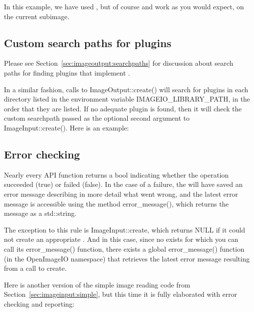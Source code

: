 In this example, we have used \readimage, but of course \readscanline
and \readtile work as you would expect, on the current subimage.


\subsection{Custom search paths for plugins}
\label{sec:imageinput:searchpaths}

Please see Section~\ref{sec:imageoutput:searchpaths} for discussion
about search paths for finding plugins that implement \ImageOutput.

In a similar fashion, calls to {\cf ImageOutput::create()}
will search for plugins in each directory listed in the environment
variable {\cf IMAGEIO_LIBRARY_PATH}, in the order that they are listed.
If no adequate plugin is found, then it will check the custom searchpath
passed as the optional second argument to {\cf ImageInput::create()}.
Here is an example:



\subsection{Error checking}
\label{sec:imageinput:errors}

Nearly every \ImageInput API function returns a {\cf bool} indicating
whether the operation succeeded ({\cf true}) or failed ({\cf false}).
In the case of a failure, the \ImageInput will have saved an error
message describing in more detail what went wrong, and the latest
error message is accessible using the \ImageInput method 
{\cf error_message()}, which returns the message as a {\cf std::string}.

The exception to this rule is {\cf ImageInput::create}, which returns
{\cf NULL} if it could not create an appropriate \ImageInput.  And in
this case, since no \ImageInput exists for which you can call its {\cf
  error_message()} function, there exists a global {\cf error_message()}
function (in the {\cf OpenImageIO} namespace) that retrieves the latest
error message resulting from a call to {\cf create}.

Here is another version of the simple image reading code from
Section~\ref{sec:imageinput:simple}, but this time it is fully
elaborated with error checking and reporting:

